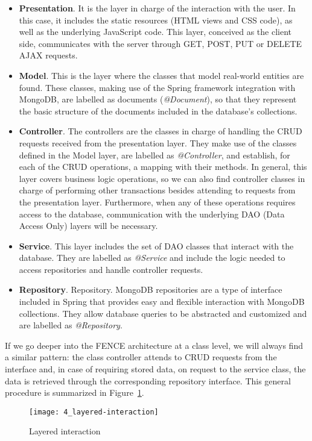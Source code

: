 \begin{itemize}
\item \textbf{Presentation}. It is the layer in charge of the interaction with the user. In this case, it includes the static resources (HTML views and CSS code), as well as the underlying JavaScript code. This layer, conceived as the client side, communicates with the server through GET, POST, PUT or DELETE AJAX requests.
\item \textbf{Model}. This is the layer where the classes that model real-world entities are found. These classes, making use of the Spring framework integration with MongoDB, are labelled as documents (\textit{@Document}), so that they represent the basic structure of the documents included in the database's collections.
\item \textbf{Controller}. The controllers are the classes in charge of handling the CRUD requests received from the presentation layer. They make use of the classes defined in the Model layer, are labelled as \textit{@Controller}, and establish, for each of the CRUD operations, a mapping with their methods. In general, this layer covers business logic operations, so we can also find controller classes in charge of performing other transactions besides attending to requests from the presentation layer. Furthermore, when any of these operations requires access to the database, communication with the underlying DAO (Data Access Only) layers will be necessary.
\item \textbf{Service}. This layer includes the set of DAO classes that interact with the database. They are labelled as \textit{@Service} and include the logic needed to access repositories and handle controller requests.
\item \textbf{Repository}. Repository. MongoDB repositories are a type of interface included in Spring that provides easy and flexible interaction with MongoDB collections. They allow database queries to be abstracted and customized and are labelled as \textit{@Repository}. 
\end{itemize}

If we go deeper into the FENCE architecture at a class level, we will always find a similar pattern: the class controller attends to CRUD requests from the interface and, in case of requiring stored data, on request to the service class, the data is retrieved through the corresponding repository interface. This general procedure is summarized in Figure~\ref{fig:layer_int}.

\begin{figure}
	\centering
	\texttt{[image: 4\_layered-interaction]}
	\caption[Layered interaction]{Layered interaction}
	\label{fig:layer_int}
\end{figure}

